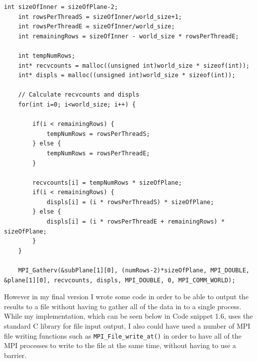 \documentclass{report}
\begin{document}
\begin{lstlisting}[style=customc,caption=How to Gather Data onto One MPI Process]
    int sizeOfInner = sizeOfPlane-2;
    int rowsPerThreadS = sizeOfInner/world_size+1;
    int rowsPerThreadE = sizeOfInner/world_size;
    int remainingRows = sizeOfInner - world_size * rowsPerThreadE;

    int tempNumRows;
    int* recvcounts = malloc((unsigned int)world_size * sizeof(int)); 
    int* displs = malloc((unsigned int)world_size * sizeof(int));

    // Calculate recvcounts and displs 
    for(int i=0; i<world_size; i++) {

        if(i < remainingRows) {
            tempNumRows = rowsPerThreadS;
        } else {
            tempNumRows = rowsPerThreadE;
        }

        recvcounts[i] = tempNumRows * sizeOfPlane;
        if(i < remainingRows) {
            displs[i] = (i * rowsPerThreadS) * sizeOfPlane;
        } else {
            displs[i] = (i * rowsPerThreadE + remainingRows) * sizeOfPlane;
        }
    }
    
    MPI_Gatherv(&subPlane[1][0], (numRows-2)*sizeOfPlane, MPI_DOUBLE, &plane[1][0], recvcounts, displs, MPI_DOUBLE, 0, MPI_COMM_WORLD);
\end{lstlisting}
However in my final version I wrote some code in order to be able to output the results to a file without having to gather all of the data in to a single process. While my implementation, which can be seen below in Code snippet 1.6, uses the standard C library for file input output, I also could have used a number of MPI file writing functions such as \lstinline[style=customc]|MPI_File_write_at()| in order to have all of the MPI processes to write to the file at the same time, without having to use a barrier.
\end{document}
